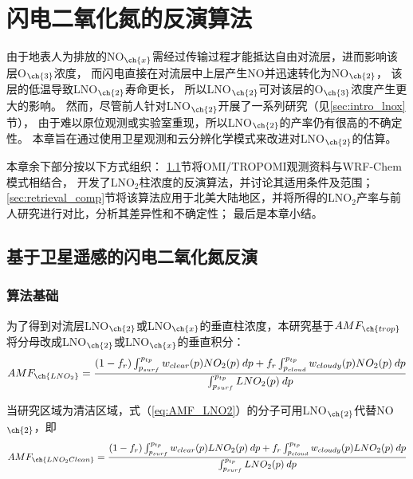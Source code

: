 
\chapter{闪电二氧化氮的反演算法} \label{sec:retrieval}

由于地表人为排放的NO$_{\ch{x}}$需经过传输过程才能抵达自由对流层，进而影响该层O$_{\ch{3}}$浓度，
而闪电直接在对流层中上层产生NO并迅速转化为NO$_{\ch{2}}$，
该层的低温导致LNO$_{\ch{2}}$寿命更长，
所以LNO$_{\ch{2}}$可对该层的O$_{\ch{3}}$浓度产生更大的影响。
然而，尽管前人针对LNO$_{\ch{2}}$开展了一系列研究（见\ref{sec:intro_lnox}节），
由于难以原位观测或实验室重现，所以LNO$_{\ch{2}}$的产率仍有很高的不确定性。
本章旨在通过使用卫星观测和云分辨化学模式来改进对LNO$_{\ch{2}}$的估算。

本章余下部分按以下方式组织：
\ref{sec:retrieval_method}节将OMI/TROPOMI观测资料与WRF-Chem模式相结合，
开发了LNO$_2$柱浓度的反演算法，并讨论其适用条件及范围；
\ref{sec:retrieval_comp}节将该算法应用于北美大陆地区，并将所得的LNO$_2$产率与前人研究进行对比，分析其差异性和不确定性；
最后是本章小结。

\section{基于卫星遥感的闪电二氧化氮反演} \label{sec:retrieval_method}

\subsection{算法基础} \label{sec:amf_definition}

为了得到对流层LNO$_{\ch{2}}$或LNO$_{\ch{x}}$的垂直柱浓度，本研究基于$AMF_{\ch{trop}}$将分母改成LNO$_{\ch{2}}$或LNO$_{\ch{x}}$的垂直积分：
\begin{equation} \label{eq:AMF_LNO2}
AMF_{\ch{LNO_2}} = \frac{(1-f_r) \int_{p_{surf}}^{p_{tp}} w_{clear}(p) NO_2(p) \: dp + f_r \int_{p_{cloud}}^{p_{tp}} w_{cloudy}(p) NO_2(p) \: dp}{\int_{p_{surf}}^{p_{tp}} LNO_2(p) \: dp}
\end{equation}

当研究区域为清洁区域，式（\ref{eq:AMF_LNO2}）的分子可用LNO$_{\ch{2}}$代替NO$_{\ch{2}}$，即
\begin{equation} \label{eq:AMF_LNO2clean}
AMF_{\ch{LNO_2Clean}} = \frac{(1-f_r) \int_{p_{surf}}^{p_{tp}} w_{clear}(p) LNO_2(p) \: dp + f_r \int_{p_{cloud}}^{p_{tp}} w_{cloudy}(p) LNO_2(p) \: dp}{\int_{p_{surf}}^{p_{tp}} LNO_2(p) \: dp}
\end{equation}

